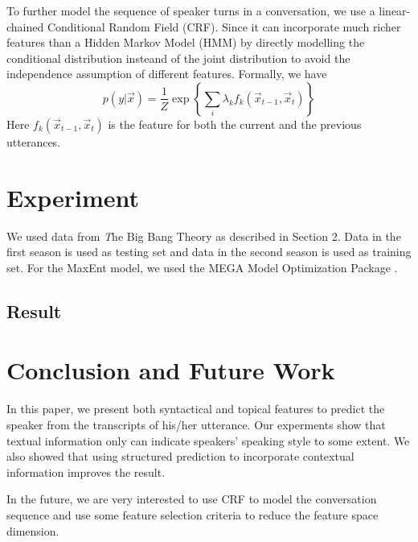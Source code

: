 \documentclass[11pt,letterpaper]{article}
\begin{document}
To further model the sequence of speaker turns in a conversation, we use a linear-chained Conditional Random Field (CRF).
Since it can incorporate much richer features than a Hidden Markov Model (HMM) by directly modelling 
the conditional distribution insteand of the joint distribution to avoid the independence assumption of
different features. Formally, we have
\begin{equation}
p(y|\vec x) = \frac{1}{Z}\exp\left\{ \sum_i \lambda_k f_k(\vec x_{t-1}, \vec x_t)\right\}
\end{equation}
Here $f_k(\vec x_{t-1}, \vec x_t)$ is the feature for both the current and the previous utterances.

\section{Experiment}
We used data from {\emph The Big Bang Theory} as described in Section 2. Data in the first season is used as testing 
set and data in the second season is used as training set. For the MaxEnt model, we used the MEGA Model Optimization Package \cite{Daume:04}. 
\subsection{Result}

\section{Conclusion and Future Work}
In this paper, we present both syntactical and topical features to predict 
the speaker from the transcripts of his/her utterance.
Our experments show that textual information only can indicate speakers'
speaking style to some extent.
We also showed that 
using structured prediction to incorporate contextual information 
improves the result. 

In the future, we are very interested to use CRF to model the conversation 
sequence and use some feature selection criteria to reduce the feature 
space dimension.
\end{document}

